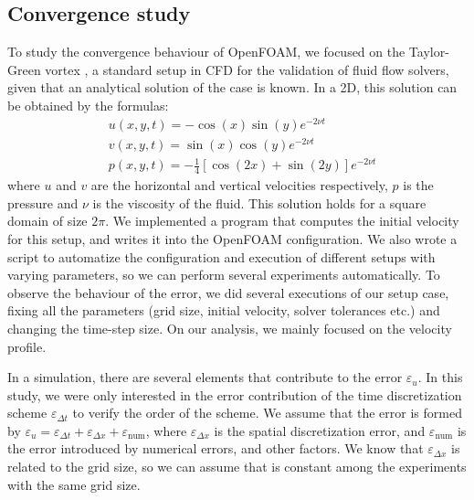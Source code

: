 \documentclass[
  english,        %
  font=times,     %
  onecolumn,      %
]{tumarticle}
\begin{document}
\subsection{Convergence study}

To study the convergence behaviour of OpenFOAM, we focused on the Taylor-Green vortex \cite{taylor1937mechanism, chorin1968numerical}, a standard setup in CFD for the validation of fluid flow solvers, given that an analytical solution of the case is known. In a 2D, this solution can be obtained by the formulas:
\begin{align}
    &u(x, y, t) = -\cos(x) \sin(y) e^{-2\nu t} \\
    &v(x, y, t) = \sin(x) \cos(y) e^{-2\nu t} \\
    &p(x, y, t) = -\frac{1}{4}\left[\cos(2x) + \sin(2y)\right]e^{-2\nu t}
\end{align}
where $u$ and $v$ are the horizontal and vertical velocities respectively, $p$ is the pressure and $\nu$ is the viscosity of the fluid. This solution holds for a square domain of size $2\pi$. 
We implemented a program that computes the initial velocity for this setup, and writes it into the OpenFOAM configuration. We also wrote a script to automatize the configuration and execution of different setups with varying parameters, so we can perform several experiments automatically.
To observe the behaviour of the error, we did several executions of our setup case, fixing all the parameters (grid size, initial velocity, solver tolerances etc.) and changing the time-step size. On our analysis, we mainly focused on the velocity profile.

In a simulation, there are several elements that contribute to the error $\varepsilon_{u}$. In this study, we were only interested in the error contribution of the time discretization scheme $\varepsilon_{\Delta t}$ to verify the order of the scheme. We assume that the error is formed by $\varepsilon_u = \varepsilon_{\Delta t} + \varepsilon_{\Delta x} + \varepsilon_\text{num}$, where $\varepsilon_{\Delta x}$ is the spatial discretization error, and $\varepsilon_\text{num}$ is the error introduced by numerical errors, and other factors. We know that $\varepsilon_{\Delta x}$ is related to the grid size, so we can assume that is constant among the experiments with the same grid size.
\end{document}
